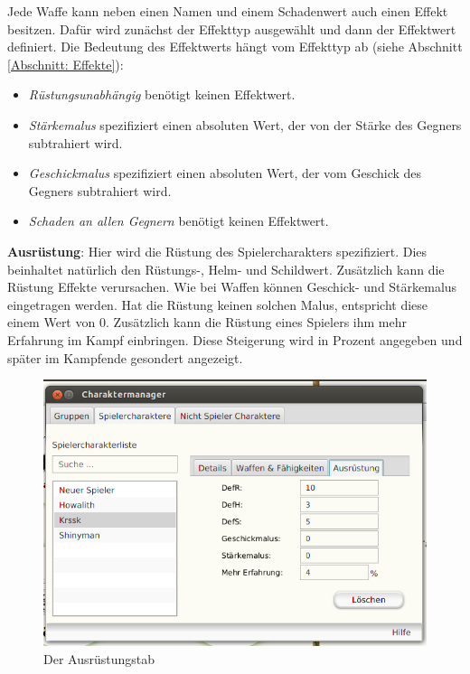 \documentclass[11pt, a4paper, german]{article}
\begin{document}
Jede Waffe kann neben einen Namen und einem Schadenwert auch einen Effekt besitzen. Dafür wird zunächst der Effekttyp ausgewählt und dann der Effektwert definiert. Die Bedeutung des Effektwerts hängt vom Effekttyp ab (siehe Abschnitt \ref{Abschnitt: Effekte}): \begin{itemize}
\item[] \textit{Rüstungsunabhängig} benötigt keinen Effektwert.
\item[] \textit{Stärkemalus} spezifiziert einen absoluten Wert, der von der Stärke des Gegners subtrahiert wird.
\item[] \textit{Geschickmalus} spezifiziert einen absoluten Wert, der vom Geschick des Gegners subtrahiert wird.
\item[] \textit{Schaden an allen Gegnern} benötigt keinen Effektwert.
\end{itemize}

\textbf{Ausrüstung}: Hier wird die Rüstung des Spielercharakters spezifiziert. Dies beinhaltet natürlich den Rüstungs-, Helm- und Schildwert. Zusätzlich kann die Rüstung Effekte verursachen. Wie bei Waffen können Geschick- und Stärkemalus eingetragen werden. Hat die Rüstung keinen solchen Malus, entspricht diese einem Wert von 0. Zusätzlich kann die Rüstung eines Spielers ihm mehr Erfahrung im Kampf einbringen. Diese Steigerung wird in Prozent angegeben und später im Kampfende gesondert angezeigt.\\ %
\begin{figure}
\centering
\includegraphics[width=1\linewidth]{Bilder/Spielercharaktermanager3}
\caption{Der Ausrüstungstab}
\label{fig:Spielercharaktermanager3}
\end{figure}
\end{document}

